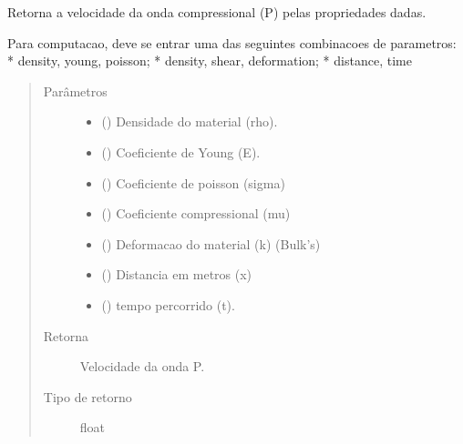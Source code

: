 \documentclass[letterpaper,10pt,brazil]{sphinxmanual}
\begin{document}
\begin{fulllineitems}
\label{\detokenize{source/base:base.Vp}}
Retorna a velocidade da onda compressional (P) pelas propriedades dadas.

Para computacao, deve se entrar uma das seguintes combinacoes de
parametros:
* density, young, poisson;
* density, shear, deformation;
* distance, time
\begin{quote}\begin{description}
\item[{Parâmetros}] \leavevmode\begin{itemize}
\item {} 
 () \textendash{} Densidade do material (rho).

\item {} 
 () \textendash{} Coeficiente de Young (E).

\item {} 
 () \textendash{} Coeficiente de poisson (sigma)

\item {} 
 () \textendash{} Coeficiente compressional (mu)

\item {} 
 () \textendash{} Deformacao do material (k) (Bulk’s)

\item {} 
 () \textendash{} Distancia em metros (x)

\item {} 
 () \textendash{} tempo percorrido (t).

\end{itemize}

\item[{Retorna}] \leavevmode
Velocidade da onda P.

\item[{Tipo de retorno}] \leavevmode
float

\end{description}\end{quote}

\end{fulllineitems}
\end{document}
